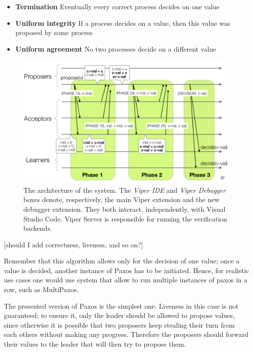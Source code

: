 \begin{itemize}
  \item \textbf{Termination} Eventually every correct process decides on one value
  \item \textbf{Uniform integrity} If a process decides on a value, then this value was proposed by some process
  \item \textbf{Uniform agreement} No two processes decide on a different value
  \end{itemize}

\begin{figure}[htb]
\centering
\includegraphics[width=\textwidth,height=\textheight,keepaspectratio]{img/paxos.png}

\caption[The architecture of the system]{ The architecture of the system. The
  \textit{Viper IDE} and \textit{Viper Debugger} boxes denote, respectively,
  the main Viper extension and the new debugger extension. They both interact,
  independently, with Visual Studio Code. Viper Server is responsible for
  running the verification backends.}
\label{fig:paxos}
\end{figure}

[should I add correctness, liveness, and so on?]

Remember that this algorithm allows only for the decision of one value; once a value is decided, another instance of Paxos has to be initiated. Hence, for realistic use cases one would use system that allow to run multiple instances of paxos in a row, such as MultiPaxos.

The presented version of Paxos is the simplest one. Liveness in this case is not guaranteed; to ensure it, only the leader should be allowed to propose values, since otherwise it is possible that two proposers keep stealing their turn from each others without making any progress. Therefore the proposers should forward their values to the leader that will then try to propose them.

